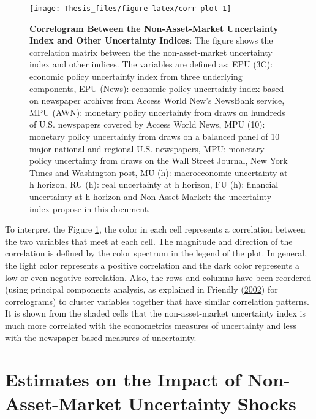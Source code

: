\documentclass[12pt,twoside]{reedthesis}
\begin{document}
\begin{figure}

{\centering \texttt{[image: Thesis\_files/figure-latex/corr-plot-1]} 

}

\caption[Correlogram Between the Non-Asset-Market Uncertainty Index and Other Uncertainty Indices]{\textbf{Correlogram Between the Non-Asset-Market Uncertainty Index and Other Uncertainty Indices}: The figure shows the correlation matrix between the the non-asset-market uncertainty index and other indices. The variables are defined as: EPU (3C): economic policy uncertainty index from three underlying components, EPU (News): economic policy uncertainty index based on newspaper archives from Access World New's NewsBank service, MPU (AWN): monetary policy uncertainty from draws on hundreds of U.S. newspapers covered by Access World News, MPU (10): monetary policy uncertainty from draws on a balanced panel of 10 major national and regional U.S. newspapers, MPU: monetary policy uncertainty from draws on the Wall Street Journal, New York Times and Washington post, MU (h): macroeconomic uncertainty at h horizon, RU (h): real uncertainty at h horizon, FU (h): financial uncertainty at h horizon and Non-Asset-Market: the uncertainty index propose in this document.}\label{fig:corr-plot}
\end{figure}
To interpret the Figure \ref{fig:corr-plot}, the color in each cell represents a correlation between the two variables that meet at each cell. The magnitude and direction of the correlation is defined by the color spectrum in the legend of the plot. In general, the light color represents a positive correlation and the dark color represents a low or even negative correlation. Also, the rows and columns have been reordered (using principal components analysis, as explained in Friendly (\protect\hyperlink{ref-friendly:2002}{2002}) for correlograms) to cluster variables together that have similar correlation patterns. It is shown from the shaded cells that the non-asset-market uncertainty index is much more correlated with the econometrics measures of uncertainty and less with the newspaper-based measures of uncertainty.

\hypertarget{estimates-on-the-impact-of-non-asset-market-uncertainty-shocks}{%
\section{Estimates on the Impact of Non-Asset-Market Uncertainty Shocks}\label{estimates-on-the-impact-of-non-asset-market-uncertainty-shocks}}
\end{document}
